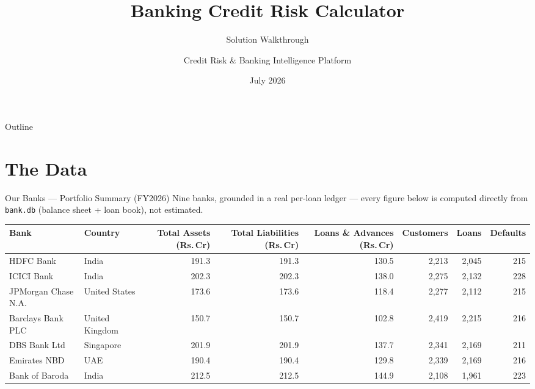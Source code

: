 \documentclass[9pt,aspectratio=169]{beamer}
\title[Banking Credit Risk Platform]{%
  Banking Credit Risk Calculator}
\subtitle{Solution Walkthrough}
\author[Credit Risk Engineering]{Credit Risk \& Banking Intelligence Platform}
\institute[Axis Bank]{%
  Banking Credit Risk Calculator --- Internal Solution Overview}
\date{July 2026}
\begin{document}

\begin{frame}
  \titlepage
\end{frame}

\begin{frame}{Outline}
  \tableofcontents
\end{frame}

\section{The Data}

\begin{frame}{Our Banks --- Portfolio Summary (FY2026)}
\vspace{-2pt}
{\footnotesize Nine banks, grounded in a real per-loan ledger --- every figure below is
computed directly from \texttt{bank.db} (balance sheet + loan book), not estimated.}\\[6pt]
\begin{center}
\scriptsize
\setlength{\tabcolsep}{3.5pt}
\begin{tabular}{lp{2.1cm}rrrrrr}
  \toprule
  \textbf{Bank} & \textbf{Country} & \textbf{Total Assets (Rs.\,Cr)} & \textbf{Total Liabilities (Rs.\,Cr)} & \textbf{Loans \& Advances (Rs.\,Cr)} & \textbf{Customers} & \textbf{Loans} & \textbf{Defaults}\\
  \midrule
  HDFC Bank             & India           & 191.3 & 191.3 & 130.5 & 2{,}213 & 2{,}045 & 215\\
  ICICI Bank             & India           & 202.3 & 202.3 & 138.0 & 2{,}275 & 2{,}132 & 228\\
  JPMorgan Chase N.A.    & United States   & 173.6 & 173.6 & 118.4 & 2{,}277 & 2{,}112 & 215\\
  Barclays Bank PLC      & United Kingdom  & 150.7 & 150.7 & 102.8 & 2{,}419 & 2{,}215 & 216\\
  DBS Bank Ltd           & Singapore       & 201.9 & 201.9 & 137.7 & 2{,}341 & 2{,}169 & 211\\
  Emirates NBD           & UAE             & 190.4 & 190.4 & 129.8 & 2{,}339 & 2{,}169 & 216\\
  Bank of Baroda          & India           & 212.5 & 212.5 & 144.9 & 2{,}108 & 1{,}961 & 223\\

\end{tabular}
\end{center}
\end{frame}
\end{document}
